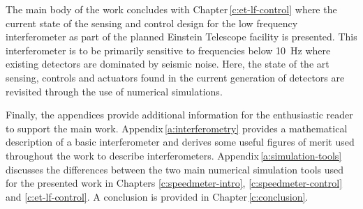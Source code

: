 The main body of the work concludes with Chapter\,\ref{c:et-lf-control} where the current state of the sensing and control design for the low frequency interferometer as part of the planned Einstein Telescope facility is presented. This interferometer is to be primarily sensitive to frequencies below \SI{10}{\hertz} where existing detectors are dominated by seismic noise. Here, the state of the art sensing, controls and actuators found in the current generation of detectors are revisited through the use of numerical simulations.

Finally, the appendices provide additional information for the enthusiastic reader to support the main work. Appendix\,\ref{a:interferometry} provides a mathematical description of a basic interferometer and derives some useful figures of merit used throughout the work to describe interferometers. Appendix\,\ref{a:simulation-tools} discusses the differences between the two main numerical simulation tools used for the presented work in Chapters \ref{c:speedmeter-intro}, \ref{c:speedmeter-control} and \ref{c:et-lf-control}. A conclusion is provided in Chapter\,\ref{c:conclusion}.